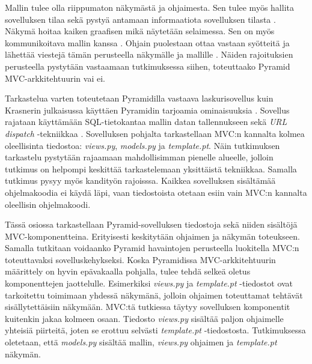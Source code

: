 \documentclass[finnish,utf8,nonumbib,palatino,kandi]{gradu2}
\begin{document}
Mallin tulee olla riippumaton näkymästä ja ohjaimesta. Sen tulee myös hallita sovelluksen tilaa sekä pystyä antamaan informaatiota sovelluksen tilasta \cite{Burbeck}. Näkymä hoitaa kaiken graafisen mikä näytetään selaimessa. Sen on myös kommunikoitava mallin kanssa \cite{Krasner:desc}. Ohjain puolestaan ottaa vastaan syötteitä ja lähettää viestejä tämän perusteella näkymälle ja mallille \cite{Burbeck}. Näiden rajoituksien perusteella pystytään vastaamaan tutkimuksessa siihen, toteuttaako Pyramid MVC-arkkitehtuurin vai ei.

Tarkastelua varten toteutetaan Pyramidilla vastaava laskurisovellus kuin Krasnerin julkaisussa käyttäen Pyramidin tarjoamia ominaisuuksia \cite{Krasner:desc}. Sovellus rajataan käyttämään SQL-tietokantaa mallin datan tallennukseen sekä \emph{URL dispatch} -tekniikkaa \cite{urldispatch, sql}. Sovelluksen pohjalta tarkastellaan MVC:n kannalta kolmea oleellisinta tiedostoa: \emph{views.py}, \emph{models.py} ja \emph{template.pt}. Näin tutkimuksen tarkastelu pystytään rajaamaan mahdollisimman pienelle alueelle, jolloin tutkimus on helpompi keskittää tarkastelemaan yksittäistä tekniikkaa. Samalla tutkimus pysyy myös kandityön rajoisssa. Kaikkea sovelluksen sisältämää ohjelmakoodia ei käydä läpi, vaan tiedostoista otetaan esiin vain MVC:n kannalta oleellisin ohjelmakoodi.

Tässä osiossa tarkastellaan Pyramid-sovelluksen tiedostoja sekä niiden sisältöjä MVC-komponentteina. Erityisesti keskitytään ohjaimen ja näkymän toteukseen. Samalla tutkitaan voidaanko Pyramid havaintojen perusteella luokitella MVC:n toteuttavaksi sovelluskehykseksi.
Koska Pyramidissa MVC-arkkitehtuurin määrittely on hyvin epävakaalla pohjalla, tulee tehdä selkeä oletus komponenttejen jaottelulle. Esimerkiksi \emph{views.py} ja \emph{template.pt} -tiedostot ovat tarkoitettu toimimaan yhdessä näkymänä, jolloin ohjaimen toteuttamat tehtävät sisällytettäisiin näkymään. MVC:tä tutkiessa täytyy sovelluksen komponentit kuitenkin jakaa kolmeen osaan.  Tiedosto \emph{views.py}
sisältää paljon ohjaimelle yhteisiä piirteitä, joten se erottuu selvästi \emph{template.pt} -tiedostosta. Tutkimuksessa oletetaan, että \emph{models.py} sisältää mallin, \emph{views.py} ohjaimen ja \emph{template.pt} näkymän.
\end{document}
